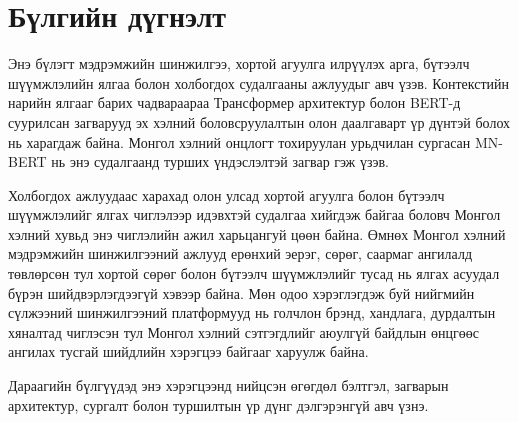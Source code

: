 \section{Бүлгийн дүгнэлт}

Энэ бүлэгт мэдрэмжийн шинжилгээ, хортой агуулга илрүүлэх арга, бүтээлч
шүүмжлэлийн ялгаа болон холбогдох судалгааны ажлуудыг авч үзэв. Контекстийн
нарийн ялгааг барих чадвараараа Трансформер архитектур болон BERT-д суурилсан
загварууд эх хэлний боловсруулалтын олон даалгаварт үр дүнтэй болох нь
харагдаж байна. Монгол хэлний онцлогт тохируулан урьдчилан сургасан MN-BERT нь
энэ судалгаанд турших үндэслэлтэй загвар гэж үзэв.

Холбогдох ажлуудаас харахад олон улсад хортой агуулга болон бүтээлч шүүмжлэлийг
ялгах чиглэлээр идэвхтэй судалгаа хийгдэж байгаа боловч Монгол хэлний хувьд
энэ чиглэлийн ажил харьцангуй цөөн байна. Өмнөх Монгол хэлний мэдрэмжийн
шинжилгээний ажлууд ерөнхий эерэг, сөрөг, саармаг ангилалд төвлөрсөн тул
хортой сөрөг болон бүтээлч шүүмжлэлийг тусад нь ялгах асуудал бүрэн
шийдвэрлэгдээгүй хэвээр байна. Мөн одоо хэрэглэгдэж буй нийгмийн сүлжээний
шинжилгээний платформууд нь голчлон брэнд, хандлага, дурдалтын хяналтад
чиглэсэн тул Монгол хэлний сэтгэгдлийг аюулгүй байдлын өнцгөөс ангилах тусгай
шийдлийн хэрэгцээ байгааг харуулж байна.

Дараагийн бүлгүүдэд энэ хэрэгцээнд нийцсэн өгөгдөл бэлтгэл, загварын
архитектур, сургалт болон туршилтын үр дүнг дэлгэрэнгүй авч үзнэ.
